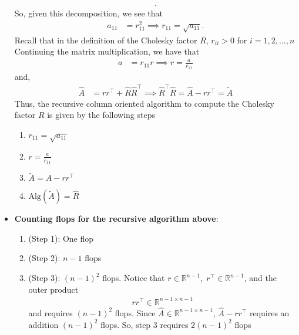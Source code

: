 \documentclass{report}
\begin{document}
\begin{itemize}
\begin{align*}
            .\end{align*}
            So, given this decomposition, we see that 
            \begin{align*}
                a_{11} &= r_{11}^{2} \implies r_{11} = \sqrt{a_{11}}
            .\end{align*}
            Recall that in the definition of the Cholesky factor $R$, $r_{ii} > 0$ for $i = 1,2,...,n  $
            \bigbreak \noindent 
            Continuing the matrix multiplication, we have that
            \begin{align*}
                a &= r_{11}r \implies r = \frac{a}{r_{11}}
            \end{align*}
            and, 
            \begin{align*}
                \hat{A} &=rr^{\top} + \hat{R}\hat{R}^{\top} \implies \hat{R}^{\top}\hat{R} = \hat{A} - rr^{\top} = \tilde{A}
            \end{align*}
            \bigbreak \noindent 
            Thus, 
            the recursive column oriented algorithm to compute the Cholesky factor $R$ is given by the following steps
            \begin{enumerate}
                \item $r_{11} = \sqrt{a_{11}}$
                \item $r = \frac{a}{r_{11}} $
                \item $\tilde{A} = \hat{A} - rr^{\top} $
                \item $\text{Alg}(\tilde{A}) = \hat{R} $
            \end{enumerate}
        \item \textbf{Counting flops for the recursive algorithm above}:
            \begin{enumerate}
                \item (Step 1): One flop
                \item (Step 2): $n-1$ flops
                \item (Step 3): $(n-1)^{2}$ flops. Notice that $r \in \mathbb{R}^{n-1},\; r^{\top} \in \mathbb{R}^{n-1}$, and the outer product
                    \begin{align*}
                        rr^{\top} \in \mathbb{R}^{n-1\times n-1}
                    \end{align*}
                    and requires $(n-1)^{2}$ flops.
                    \bigbreak \noindent 
                    Since $\hat{A} \in \mathbb{R}^{n-1\times n-1}$, $ \hat{A} - rr^{\top}$ requires an addition $(n-1)^{2}$ flops. So, step 3 requires $2(n-1)^{2}$ flops

\end{enumerate}
\end{itemize}
\end{document}
